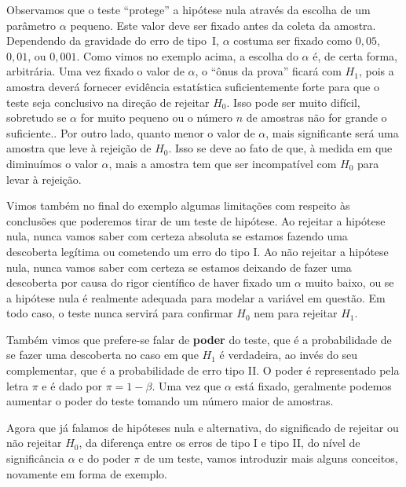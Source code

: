 \documentclass[12pt,a4paper]{article}
\theoremstyle{plain}
\theoremstyle{definition}
\theoremstyle{remark}
\begin{document}
Observamos que o teste ``protege'' a hipótese nula através da escolha de um parâmetro $\alpha$ pequeno.
Este valor deve ser fixado antes da coleta da amostra.
Dependendo da gravidade do erro de tipo~I, $\alpha$ costuma ser fixado como
$0,05$, $0,01$, ou $0,001$.
Como vimos no exemplo acima, a escolha do $\alpha$ é, de certa forma, arbitrária.
Uma vez fixado o valor de $\alpha$, o ``ônus da prova'' ficará com $H_1$, pois a amostra deverá fornecer evidência estatística suficientemente forte para que o teste seja conclusivo na direção de rejeitar $H_0$.
Isso pode ser muito difícil, sobretudo se $\alpha$ for muito pequeno ou o número $n$ de amostras não for grande o suficiente..
Por outro lado, quanto menor o valor de $\alpha$, mais significante será uma amostra que leve à rejeição de $H_0$. Isso se deve ao fato de que, à medida em que diminuímos o valor $\alpha$, mais a amostra tem que ser incompatível com $H_0$ para levar à rejeição.

Vimos também no final do exemplo algumas limitações com respeito às conclusões que poderemos tirar de um teste de hipótese.
Ao rejeitar a hipótese nula, nunca vamos saber com certeza absoluta se estamos fazendo uma descoberta legítima ou cometendo um erro do tipo I.
Ao não rejeitar a hipótese nula, nunca vamos saber com certeza se estamos deixando de fazer uma descoberta por causa do rigor científico de haver fixado um $\alpha$ muito baixo, ou se a hipótese nula é realmente adequada para modelar a variável em questão.
Em todo caso, o teste nunca servirá para confirmar $H_0$ nem para rejeitar $H_1$.

Também vimos que prefere-se falar de \textbf{poder} do teste, que é a probabilidade de se fazer uma descoberta no caso em que $H_1$ é verdadeira, ao invés do seu complementar, que é a probabilidade de erro tipo II.
O poder é representado pela letra $\pi$ e é dado por $\pi = 1-\beta$.
Uma vez que $\alpha$ está fixado, geralmente podemos aumentar o poder do teste tomando um número maior de amostras.

Agora que já falamos de hipóteses nula e alternativa, do significado de rejeitar ou não rejeitar $H_0$, da diferença entre os erros de tipo I e tipo II, do nível de significância $\alpha$ e do poder $\pi$ de um teste, vamos introduzir mais alguns conceitos, novamente em forma de exemplo.
\end{document}
